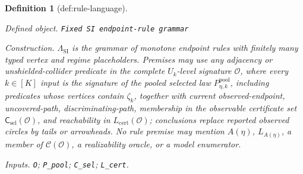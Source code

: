 \documentclass{article}
\newtheorem{definition}{Definition}
\begin{document}
\begin{definition}[def:rule-language]\label{def:rule-language}
\par\smallskip\noindent\emph{Defined object.} \texttt{Fixed SI endpoint-\allowbreak{}rule grammar}
\par\smallskip\noindent\emph{Construction.} \(\Lambda_{\mathrm{SI}}\) is the grammar of monotone endpoint rules with finitely many typed vertex and regime placeholders. Premises may use any adjacency or unshielded-collider predicate in the complete \(U_k\)-level signature \(\mathcal O\), where every \(k\in[K]\) input is the signature of the pooled selected law \(P_{\eta,k}^{\mathrm{pool}}\), including predicates whose vertices contain \(\zeta_k\), together with current observed-endpoint, uncovered-path, discriminating-path, membership in the observable certificate set \(\mathsf C_{\mathrm{sel}}(\mathcal O)\), and reachability in \(L_{\mathrm{cert}}(\mathcal O)\); conclusions replace reported observed circles by tails or arrowheads. No rule premise may mention \(A(\eta)\), \(L_{A(\eta)}\), a member of \(\mathcal C(\mathcal O)\), a realizability oracle, or a model enumerator.
\par\smallskip\noindent\emph{Inputs.} \texttt{O}; \texttt{P\_\allowbreak{}pool}; \texttt{C\_\allowbreak{}sel}; \texttt{L\_\allowbreak{}cert}.
\end{definition}
\end{document}
